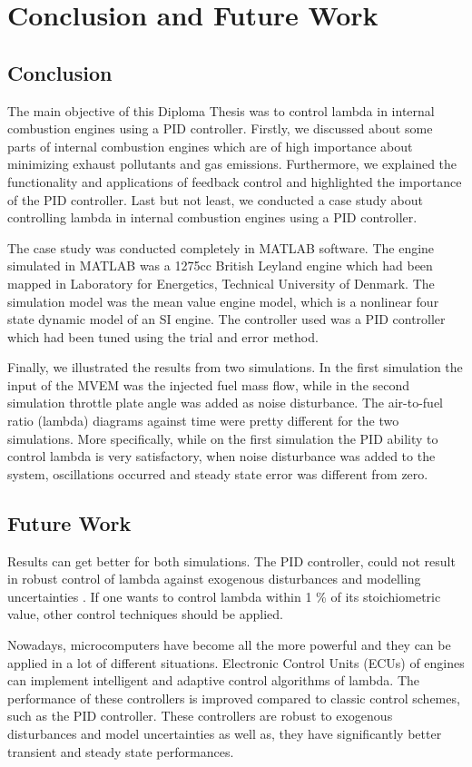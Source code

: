 \chapter{Conclusion and Future Work} \label{ch:6}

\section{Conclusion}
The main objective of this Diploma Thesis was to control lambda in internal combustion engines using a PID controller. Firstly, we discussed about some parts of internal combustion engines which are of high importance about minimizing exhaust pollutants and gas emissions. Furthermore, we explained the functionality and applications of feedback control and highlighted the importance of the PID controller. Last but not least, we conducted a case study about controlling lambda in internal combustion engines using a PID controller.

The case study was conducted completely in MATLAB software. The engine simulated in MATLAB was a 1275cc British Leyland engine which had been mapped in Laboratory for Energetics, Technical University of Denmark. The simulation model was the mean value engine model, which is a nonlinear four state dynamic model of an SI engine. The controller used was a PID controller which had been tuned using the trial and error method.

Finally, we illustrated the results from two simulations. In the first simulation the input of the MVEM was the injected fuel mass flow, while in the second simulation throttle plate angle was added as noise disturbance. The air-to-fuel ratio (lambda) diagrams against time were pretty different for the two simulations. More specifically, while on the first simulation the PID ability to control lambda is very satisfactory, when noise disturbance was added to the system, oscillations occurred and steady state error was different from zero.


\section{Future Work}
Results can get better for both simulations. The PID controller, could not result in robust control of lambda against exogenous disturbances and modelling uncertainties \cite{zhai2009neural}. If one wants to control lambda within 1 \% of its stoichiometric value, other control techniques should be applied.

Nowadays, microcomputers have become all the more powerful and they can be applied in a lot of different situations. Electronic Control Units (ECUs) of engines can implement intelligent and adaptive control algorithms of lambda. The performance of these controllers is improved compared to classic control schemes, such as the PID controller. These controllers are robust to exogenous disturbances and model uncertainties as well as, they have significantly better transient and steady state performances.

  
